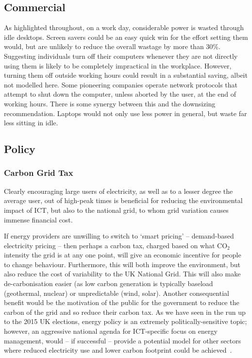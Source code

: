 \documentclass[conference]{IEEEtran}
\begin{document}
\subsection{Commercial}


As highlighted throughout, on a work day, considerable power is wasted
through idle desktops. Screen savers could be an easy quick win for
the effort setting them would, but are unlikely to reduce the overall
wastage by more than 30\%. Suggesting individuals turn off their
computers whenever they are not directly using them is likely to be
completely impractical in the workplace. However, turning them off
outside working hours could result in a substantial saving, albeit not
modelled here. Some pioneering companies operate network protocols
that attempt to shut down the computer, unless aborted by the user, at
the end of working hours. There is some synergy between this and the
downsizing recommendation. Laptops would not only use less power in
general, but waste far less sitting in idle.

\subsection{Policy}

\subsubsection{Carbon Grid Tax}

Clearly encouraging large users of electricity, as well as to a lesser
degree the average user, out of high-peak times is beneficial for
reducing the environmental impact of ICT, but also to the national
grid, to whom grid variation causes immense financial cost.

If energy providers are unwilling to switch to `smart pricing' --
demand-based electricity pricing -- then perhaps a
carbon tax, charged based on what CO$_2$ intensity the grid is at any
one point, will give an economic incentive for people to change
behaviour. Furthermore, this will both improve the environment, but
also reduce the cost of variability to the UK National Grid. This will
also make de-carbonisation easier (as low carbon generation is
typically baseload (geothermal, nuclear) or unpredictable (wind,
solar). Another consequential benefit would be the motivation of the
public for the government to reduce the carbon of the grid and so
reduce their carbon tax. As we have seen in the run up to the 2015 UK
elections, energy policy is an extremely politically-sensitive topic;
however, an aggressive national agenda for ICT-specific focus on
energy management, would -- if successful -- provide a potential model
for other sectors where reduced electricity use and lower carbon
footprint could be achieved~\cite{smart2020:2008,ruth:2011}.
\end{document}
